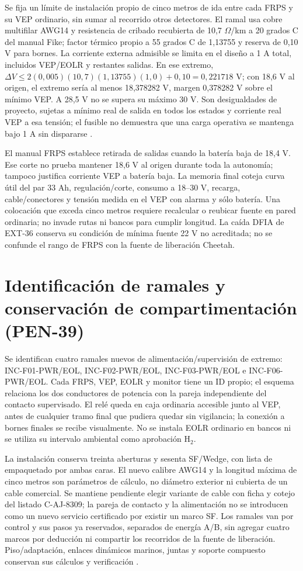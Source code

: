 Se fija un límite de instalación propio de cinco metros de ida entre cada FRPS y su VEP ordinario, sin sumar al recorrido otros detectores. El ramal usa cobre multifilar AWG14 y resistencia de cribado recubierta de 10,7 $\Omega$/km a 20 grados C del manual Fike; factor térmico propio a 55 grados C de 1,13755 y reserva de 0,10 V para bornes. La corriente externa admisible se limita en el diseño a 1 A total, incluidos VEP/EOLR y restantes salidas. En ese extremo, $\Delta V\leq2(0,005)(10,7)(1,13755)(1,0)+0,10=0,221718$ V; con 18,6 V al origen, el extremo sería al menos 18,378282 V, margen 0,378282 V sobre el mínimo VEP. A 28,5 V no se supera su máximo 30 V. Son desigualdades de proyecto, sujetas a mínimo real de salida en todos los estados y corriente real VEP a esa tensión; el fusible no demuestra que una carga operativa se mantenga bajo 1 A sin dispararse \parencite[sec.~1.3]{lote39-frpsmanual}\parencite[p.~4-3]{lote33-cheetah11}.

El manual FRPS establece retirada de salidas cuando la batería baja de 18,4 V. Ese corte no prueba mantener 18,6 V al origen durante toda la autonomía; tampoco justifica corriente VEP a batería baja. La memoria final coteja curva útil del par 33 Ah, regulación/corte, consumo a 18--30 V, recarga, cable/conectores y tensión medida en el VEP con alarma y sólo batería. Una colocación que exceda cinco metros requiere recalcular o reubicar fuente en pared ordinaria; no invade rutas ni bancos para cumplir longitud. La caída DFIA de EXT-36 conserva su condición de mínima fuente 22 V no acreditada; no se confunde el rango de FRPS con la fuente de liberación Cheetah.

\section{Identificación de ramales y conservación de compartimentación (PEN-39)}
\label{sec:sd4-pen39}
Se identifican cuatro ramales nuevos de alimentación/supervisión de extremo: INC-F01-PWR/EOL, INC-F02-PWR/EOL, INC-F03-PWR/EOL e INC-F06-PWR/EOL. Cada FRPS, VEP, EOLR y monitor tiene un ID propio; el esquema relaciona los dos conductores de potencia con la pareja independiente del contacto supervisado. El relé queda en caja ordinaria accesible junto al VEP, antes de cualquier tramo final que pudiera quedar sin vigilancia; la conexión a bornes finales se recibe visualmente. No se instala EOLR ordinario en bancos ni se utiliza su intervalo ambiental como aprobación H$_2$.

La instalación conserva treinta aberturas y sesenta SF/Wedge, con lista de empaquetado por ambas caras. El nuevo calibre AWG14 y la longitud máxima de cinco metros son parámetros de cálculo, no diámetro exterior ni cubierta de un cable comercial. Se mantiene pendiente elegir variante de cable con ficha y cotejo del listado C-AJ-8309; la pareja de contacto y la alimentación no se introducen como un nuevo servicio certificado por existir un marco SF. Los ramales van por control y sus pasos ya reservados, separados de energía A/B, sin agregar cuatro marcos por deducción ni compartir los recorridos de la fuente de liberación. Piso/adaptación, enlaces dinámicos marinos, juntas y soporte compuesto conservan sus cálculos y verificación \parencite[pp.~3--4]{lote30-caj8309}.


